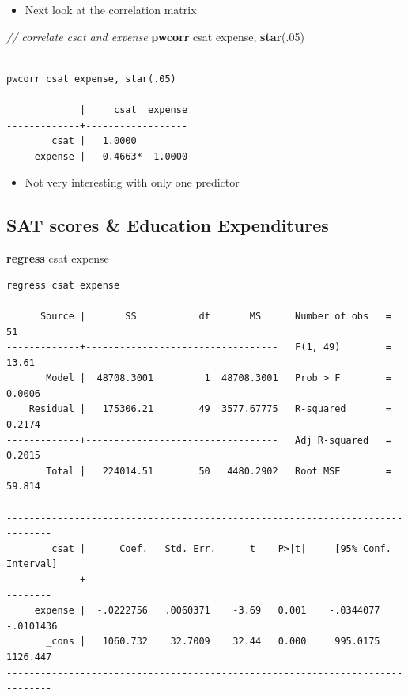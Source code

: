 \documentclass[]{book}
\newenvironment{Shaded}{\begin{snugshade}}{\end{snugshade}}
\newcommand{\CommentTok}[1]{\textcolor[rgb]{0.56,0.35,0.01}{\textit{#1}}}
\newcommand{\KeywordTok}[1]{\textcolor[rgb]{0.13,0.29,0.53}{\textbf{#1}}}
\newcommand{\NormalTok}[1]{#1}
\providecommand{\tightlist}{%
  \setlength{\itemsep}{0pt}\setlength{\parskip}{0pt}}
\begin{document}
\begin{itemize}
\tightlist
\item
  Next look at the correlation matrix
\end{itemize}

\begin{Shaded}
\begin{Highlighting}[]
  \CommentTok{// correlate csat and expense}
  \KeywordTok{pwcorr}\NormalTok{ csat expense, }\KeywordTok{star}\NormalTok{(.05)}
\end{Highlighting}
\end{Shaded}

\begin{verbatim}

pwcorr csat expense, star(.05)

             |     csat  expense
-------------+------------------
        csat |   1.0000 
     expense |  -0.4663*  1.0000
\end{verbatim}

\begin{itemize}
\tightlist
\item
  Not very interesting with only one predictor
\end{itemize}

\hypertarget{sat-scores-education-expenditures}{%
\subsection{SAT scores \& Education Expenditures}\label{sat-scores-education-expenditures}}

\begin{Shaded}
\begin{Highlighting}[]
  \KeywordTok{regress}\NormalTok{ csat expense}
\end{Highlighting}
\end{Shaded}

\begin{verbatim}
regress csat expense

      Source |       SS           df       MS      Number of obs   =        51
-------------+----------------------------------   F(1, 49)        =     13.61
       Model |  48708.3001         1  48708.3001   Prob > F        =    0.0006
    Residual |   175306.21        49  3577.67775   R-squared       =    0.2174
-------------+----------------------------------   Adj R-squared   =    0.2015
       Total |   224014.51        50   4480.2902   Root MSE        =    59.814

------------------------------------------------------------------------------
        csat |      Coef.   Std. Err.      t    P>|t|     [95% Conf. Interval]
-------------+----------------------------------------------------------------
     expense |  -.0222756   .0060371    -3.69   0.001    -.0344077   -.0101436
       _cons |   1060.732    32.7009    32.44   0.000     995.0175    1126.447
------------------------------------------------------------------------------
\end{verbatim}
\end{document}

